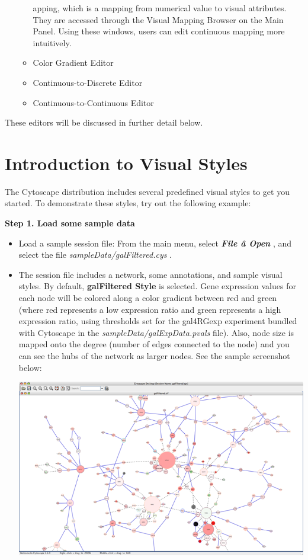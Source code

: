 \begin{enumerate}
\begin{itemize}
apping, which is a mapping from numerical value to visual attributes. They are accessed through the Visual Mapping Browser on the Main Panel. Using these windows, users can edit continuous mapping more intuitively. 
\item Color Gradient Editor 
\item Continuous-to-Discrete Editor 
\item Continuous-to-Continuous Editor 
\end{itemize}

\end{enumerate}
 These editors will be discussed in further detail below. 
\section{Introduction to Visual Styles}
The Cytoscape distribution includes several predefined visual styles to get you started. To demonstrate these styles, try out the following example: 

\textbf{Step 1. Load some sample data}

\begin{itemize}
\item 

 Load a sample session file: From the main menu, select \emph{\textbf{File \^a Open}
}
, and select the file \emph{sampleData/galFiltered.cys}
. 

\item 

 The session file includes a network, some annotations, and sample visual styles. By default, \textbf{galFiltered Style}
 is selected. Gene expression values for each node will be colored along a color gradient between red and green (where red represents a low expression ratio and green represents a high expression ratio, using thresholds set for the gal4RGexp experiment bundled with Cytoscape in the \emph{sampleData/galExpData.pvals}
 file). Also, node size is mapped onto the degree (number of edges connected to the node) and you can see the hubs of the network as larger nodes. See the sample screenshot below: 


 \includegraphics[width=.6\textwidth]{images/galFilteredSessionDefault.png} 


\end{itemize}


